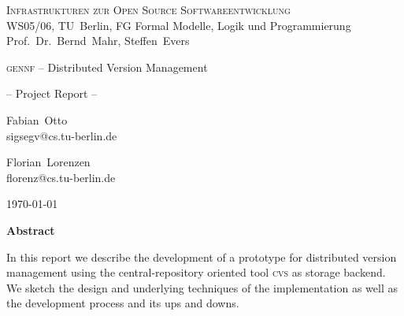 \documentclass[fleqn, 10pt, a4paper]{report} \usepackage{amssymb}
\newcommand{\GENNF}{\textsc{gennf}}
\begin{document}
\thispagestyle{empty}


\begin{center}
  {\scshape Infrastrukturen zur Open Source Softwareentwicklung} \\
  WS05/06, TU~Berlin, FG Formal Modelle, Logik und
  Programmierung \\
  Prof.~Dr.~Bernd~Mahr, Steffen~Evers \bigskip \bigskip

  {\LARGE \GENNF{} -- Distributed Version Management} \medskip

  {\Large -- Project Report --} \bigskip \bigskip

  {\large
    \begin{minipage}[t]{0.35\linewidth}
      \begin{center}
        Fabian~Otto \\ \vspace{-2mm} {\scriptsize\ttfamily
          sigsegv@cs.tu-berlin.de}
      \end{center}
    \end{minipage}\hspace{8mm}
    \begin{minipage}[t]{0.35\linewidth}
      \begin{center}
        Florian~Lorenzen \\ \vspace{-2mm} {\scriptsize\ttfamily
          florenz@cs.tu-berlin.de}
      \end{center}
    \end{minipage}
    \bigskip \bigskip

    \today}

\end{center}


\begin{center}\textbf{Abstract}\end{center}

\begin{center}
  \parbox{0.85\textwidth}{ In this report we describe the development
    of a prototype for distributed version management using the
    central-repository oriented tool \textsc{cvs} as storage backend.
    We sketch the design and underlying techniques of the
    implementation as well as the development process and its ups and
    downs.}
\end{center}
\end{document}
